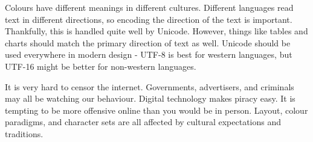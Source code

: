 \documentclass[../main.tex]{subfile}
\begin{document}

Colours have different meanings in different cultures. Different languages read text in different directions, so encoding the direction of the text is important. Thankfully, this is handled quite well by Unicode. However, things like tables and charts should match the primary direction of text as well. Unicode should be used everywhere in modern design - UTF-8 is best for western languages, but UTF-16 might be better for non-western languages.


It is very hard to censor the internet. Governments, advertisers, and criminals may all be watching our behaviour. Digital technology makes piracy easy. It is tempting to be more offensive online than you would be in person. Layout, colour paradigms, and character sets are all affected by cultural expectations and traditions.
\end{document}
